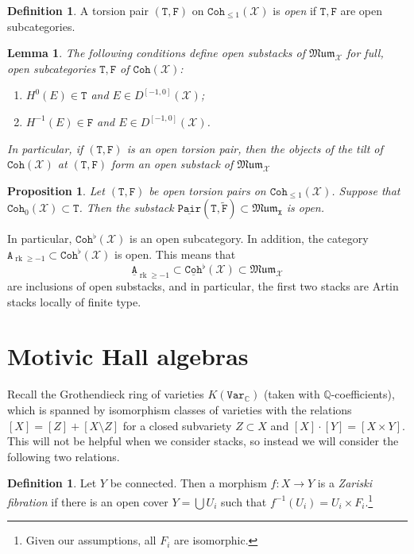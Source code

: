 \documentclass{amsart}
\newtheorem{prop}[thm]{Proposition}
\newtheorem{lem}[thm]{Lemma}
\theoremstyle{definition}
\newtheorem{defn}[thm]{Definition}
\theoremstyle{remark}
\theoremstyle{plain}
\theoremstyle{definition}
\theoremstyle{remark}
\newcommand{\C}{\mathbb{C}}
\newcommand{\Q}{\mathbb{Q}}
\newcommand{\mc}[1]{\mathcal{#1}}
\newcommand{\mf}[1]{\mathfrak{#1}}
\newcommand{\on}[1]{\operatorname{#1}}
\newcommand{\mt}[1]{\mathtt{#1}}
\newcommand{\ul}[1]{\underline{#1}}
\newcommand{\wt}[1]{\widetilde{#1}}
\newcommand{\1}{\mathbf{1}}
\newcommand{\2}{\mathbf{2}}
\newcommand{\3}{\mathbf{3}}
\begin{document}
\begin{defn}
    A torsion pair $(\mt{T}, \mt{F})$ on $\mt{Coh}_{\leq 1}(\mc{X})$ is \textit{open} if $\mt{T}, \mt{F}$ are open subcategories.
\end{defn}

\begin{lem}
    The following conditions define open substacks of $\mf{Mum}_{\mc{X}}$ for full, open subcategories $\mt{T}, \mt{F}$ of $\mt{Coh}(\mc{X})$:
    \begin{enumerate}
        \item $H^0(E) \in \mt{T}$ and $E \in D^{[-1,0]}(\mc{X})$;
        \item $H^{-1}(E) \in \mt{F}$ and $E \in D^{[-1,0]}(\mc{X})$.
    \end{enumerate}
    In particular, if $(\mt{T}, \mt{F})$ is an open torsion pair, then the objects of the tilt of $\mt{Coh}(\mc{X})$ at $(\mt{T}, \mt{F})$ form an open substack of $\mf{Mum}_{\mc{X}}$
\end{lem}

\begin{prop}
    Let $(\mt{T}, \mt{F})$ be open torsion pairs on $\mt{Coh}_{\leq 1}(\mc{X})$. Suppose that $\mt{Coh}_0(\mc{X}) \subset \mt{T}$. Then the substack $\mt{\ul{Pair}(T, \wt{F})} \subset \mf{Mum}_{\mt{X}}$ is open.
\end{prop}

In particular, $\mt{Coh}^{\flat}(\mc{X})$ is an open subcategory. In addition, the category $\mt{A}_{\on{rk}\geq -1} \subset \mt{Coh}^{\flat}(\mc{X})$ is open. This means that
\[ \mt{\ul{A}}_{\on{rk} \geq -1} \subset \ul{\mt{Coh}}^{\flat}(\mc{X}) \subset \mf{Mum}_{\mc{X}} \]
are inclusions of open substacks, and in particular, the first two stacks are Artin stacks locally of finite type.

\section{Motivic Hall algebras}

Recall the Grothendieck ring of varieties $K(\mt{Var}_{\C})$ (taken with $\Q$-coefficients), which is spanned by isomorphism classes of varieties with the relations $[X] = [Z] + [X \setminus Z]$ for a closed subvariety $Z \subset X$ and $[X] \cdot [Y] = [X \times Y]$. This will not be helpful when we consider stacks, so instead we will consider the following two relations.

\begin{defn}
    Let $Y$ be connected. Then a morphism $f \colon X \to Y$ is a \textit{Zariski fibration} if there is an open cover $Y = \bigcup U_i$ such that $f^{-1}(U_i) = U_i \times F_i$.\footnote{Given our assumptions, all $F_i$ are isomorphic.}
\end{defn}
\end{document}
